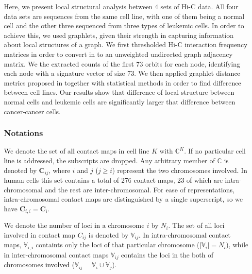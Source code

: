 \documentclass[a4,center,fleqn]{NAR}
\begin{document}
Here, we present local structural analysis between
4 sets of Hi-C data. All four data sets are sequences
from the same cell line, with one of them being
a normal cell and the other three sequenced from
three types of leukemic cells. In order to achieve
this, we used graphlets, given their strength in
capturing information about local structures of
a graph. We first thresholded Hi-C interaction frequency
matrices in order to convert in to an unweighted undirected
graph adjacency matrix. We the extracted counts of
the first 73 orbits for each node, identifying each
node with a signature vector of size 73. We then
applied graphlet distance metrics proposed in
\cite{prvzulj2007biological} together with statistical methods
in order to find difference between cell lines.
Our results show that difference of local structure
between normal cells and leukemic cells are significantly
larger that difference between cancer-cancer cells.  

\subsubsection{Notations}

We denote the set of all contact maps in cell line $K$ with 
$\mathbb{C}^K$. If no particular cell line is addressed, the
subscripts are dropped.
Any arbitrary member of $\mathbb{C}$ is denoted by 
$\mathbf{C}_{ij}$, where $i$ and $j$ ($j \ge i$) 
represent the two chromosomes involved. 
In human cells this set contains a total of 276 contact maps,
23 of which are intra-chromosomal and the rest are inter-chromosomal.
For ease of representations, intra-chromosomal contact maps are
distinguished by a single superscript, so we have $\mathbf{C}_{i,i} =
\mathbf{C}_i$.

We denote the number of loci in a chromosome $i$ by $N_i$.
The set of all loci involved in contact map $C_{ij}$ is denoted 
by $\mathbb{V}_{ij}$.
In intra-chromosomal contact maps, $\mathbb{V}_{i,i}$ containts only the 
loci of that particular chromosome ($|\mathbb{V}_i| = N_i$), while in 
inter-chromosomal contact maps $\mathbb{V}_{ij}$ contains the loci in
the both of chromosomes involved 
($\mathbb{V}_{ij} = \mathbb{V}_i \cup \mathbb{V}_j$).
\end{document}
